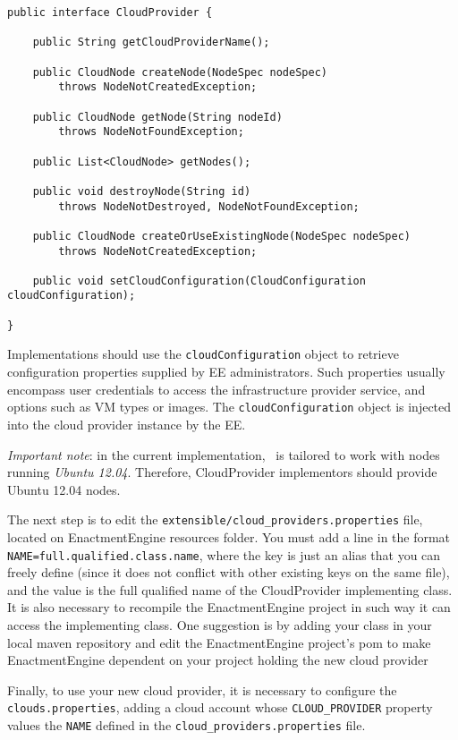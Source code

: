 {\footnotesize
\begin{lstlisting}[caption=\textsf{CloudProvider} interface, label=lst:cloud_provider]
public interface CloudProvider {

    public String getCloudProviderName();

    public CloudNode createNode(NodeSpec nodeSpec) 
    	throws NodeNotCreatedException;

    public CloudNode getNode(String nodeId) 
    	throws NodeNotFoundException;

    public List<CloudNode> getNodes();

    public void destroyNode(String id) 
    	throws NodeNotDestroyed, NodeNotFoundException;

    public CloudNode createOrUseExistingNode(NodeSpec nodeSpec) 
    	throws NodeNotCreatedException;

    public void setCloudConfiguration(CloudConfiguration cloudConfiguration);

}
\end{lstlisting}
}

Implementations should use the \texttt{cloudConfiguration} object to retrieve 
configuration properties supplied by EE administrators. Such properties usually encompass
user credentials to access the infrastructure provider service, and options
such as VM types or images. The \texttt{cloudConfiguration} object is injected
into the cloud provider instance by the EE.

\emph{Important note}: in the current implementation, \ee\ is tailored to work with nodes running \emph{Ubuntu 12.04}. Therefore, \textsf{CloudProvider} implementors should provide Ubuntu 12.04 nodes. 

The next step is to edit the \texttt{extensible/cloud\_providers.properties} file, located on EnactmentEngine resources folder. You must add a line in the format \verb!NAME=full.qualified.class.name!, where the key is just an alias that you can freely define (since it does not conflict with other existing keys on the same file), and the value is the full qualified name of the \textsf{CloudProvider} implementing class. It is also necessary to recompile the EnactmentEngine project in such way it can access the implementing class. One suggestion is by adding your class in your local maven repository and edit the EnactmentEngine project's pom to make EnactmentEngine dependent on your project holding the new cloud provider

Finally, to use your new cloud provider, it is necessary to configure the \texttt{clouds.properties},
adding a cloud account whose \verb!CLOUD_PROVIDER! property values the \verb!NAME! defined in the \texttt{cloud\_providers.properties} file.


